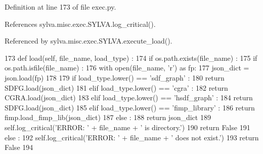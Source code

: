 Definition at line 173 of file exec.\+py.



References sylva.\+misc.\+exec.\+S\+Y\+L\+V\+A.\+log\+\_\+critical().



Referenced by sylva.\+misc.\+exec.\+S\+Y\+L\+V\+A.\+execute\+\_\+load().


\begin{DoxyCode}
173   \textcolor{keyword}{def }load(self, file\_name, load\_type) :
174     \textcolor{keywordflow}{if} os.path.exists(file\_name) :
175       \textcolor{keywordflow}{if} os.path.isfile(file\_name) :
176         with open(file\_name, \textcolor{stringliteral}{'r') as fp:}
177 \textcolor{stringliteral}{          json\_dict = json.load(fp)}
178 \textcolor{stringliteral}{}
179 \textcolor{stringliteral}{        }\textcolor{keywordflow}{if} load\_type.lower() == \textcolor{stringliteral}{'sdf\_graph'} :
180           \textcolor{keywordflow}{return} SDFG.load(json\_dict)
181         \textcolor{keywordflow}{elif} load\_type.lower() == \textcolor{stringliteral}{'cgra'} :
182           \textcolor{keywordflow}{return} CGRA.load(json\_dict)
183         \textcolor{keywordflow}{elif} load\_type.lower() == \textcolor{stringliteral}{'hsdf\_graph'} :
184           \textcolor{keywordflow}{return} SDFG.load(json\_dict)
185         \textcolor{keywordflow}{elif} load\_type.lower() == \textcolor{stringliteral}{'fimp\_library'} :
186           \textcolor{keywordflow}{return} fimp.load\_fimp\_lib(json\_dict)
187         \textcolor{keywordflow}{else} :
188           \textcolor{keywordflow}{return} json\_dict
189       self.log\_critical(\textcolor{stringliteral}{'ERROR: '} + file\_name + \textcolor{stringliteral}{' is directory.'})
190       \textcolor{keywordflow}{return} \textcolor{keyword}{False}
191     \textcolor{keywordflow}{else} :
192       self.log\_critical(\textcolor{stringliteral}{'ERROR: '} + file\_name + \textcolor{stringliteral}{' does not exist.'})
193       \textcolor{keywordflow}{return} \textcolor{keyword}{False}
194 
\end{DoxyCode}
\mbox{\label{classsylva_1_1misc_1_1exec_1_1_s_y_l_v_a_a9b8d4f144cb6e5feedd40761fdc3394f}} 
